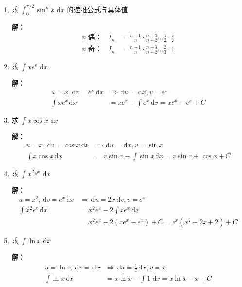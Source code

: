 \documentclass[12pt,a4paper]{article}
\newcommand{\dd}{\,\mathrm{d}}
\newcommand{\Lim}[2]{\lim\limits_{#1 \to #2}}
\begin{document}
\begin{enumerate}[label=\textbf{\arabic*.}, leftmargin=*, itemsep=1.2em]
\textbf{极限：} $\displaystyle \Lim{n}{\infty} I_n = 0$（因 $\sin^n x$ 一致收敛于0）

\item 求 $\displaystyle \int_0^{\pi/2} \sin^n x \, \dd x$ 的递推公式与具体值

\textbf{解：}
\begin{align*}
n \text{ 偶：} \quad I_n &= \frac{n-1}{n} \cdot \frac{n-3}{n-2} \dots \frac{1}{2} \cdot \frac{\pi}{2} \\
n \text{ 奇：} \quad I_n &= \frac{n-1}{n} \cdot \frac{n-3}{n-2} \dots \frac{2}{3} \cdot 1
\end{align*}

\item 求 $\displaystyle \int x e^x \, \dd x$

\textbf{解：}
\begin{align*}
u=x, \dd v=e^x \dd x &\Rightarrow \dd u=\dd x, v=e^x \\
\int x e^x \dd x &= x e^x - \int e^x \dd x = x e^x - e^x + C
\end{align*}

\item 求 $\displaystyle \int x \cos x \, \dd x$

\textbf{解：}
\begin{align*}
u=x, \dd v=\cos x \dd x &\Rightarrow \dd u=\dd x, v=\sin x \\
\int x \cos x \dd x &= x \sin x - \int \sin x \dd x = x \sin x + \cos x + C
\end{align*}

\item 求 $\displaystyle \int x^2 e^x \, \dd x$

\textbf{解：}
\begin{align*}
u=x^2, \dd v=e^x \dd x &\Rightarrow \dd u=2x \dd x, v=e^x \\
\int x^2 e^x \dd x &= x^2 e^x - 2 \int x e^x \dd x \\
&= x^2 e^x - 2(x e^x - e^x) + C = e^x(x^2-2x+2)+C
\end{align*}

\item 求 $\displaystyle \int \ln x \, \dd x$

\textbf{解：}
\begin{align*}
u=\ln x, \dd v=\dd x &\Rightarrow \dd u=\frac{1}{x}\dd x, v=x \\
\int \ln x \dd x &= x \ln x - \int 1 \, \dd x = x \ln x - x + C
\end{align*}


\end{enumerate}
\end{document}

